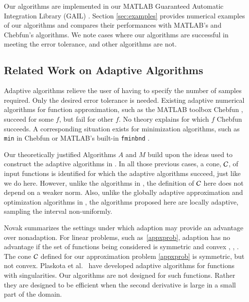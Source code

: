 \documentclass[review]{elsarticle}
\theoremstyle{definition}
\begin{document}
Our algorithms are implemented in our MATLAB Guaranteed Automatic
Integration Library (GAIL) \cite{ChoEtal15a}. Section \ref{sec:examples}
provides numerical examples of our algorithms and compares their
performances with MATLAB's and Chebfun's algorithms. We note cases where our
algorithms are successful in meeting the error tolerance, and other
algorithms are not.

\subsection{Related Work on Adaptive Algorithms}

Adaptive algorithms relieve the user of having to specify the number of samples
required. Only the desired error tolerance is needed. Existing adaptive
numerical algorithms for function approximation, such as the MATLAB toolbox
Chebfun \citep{TrefEtal16a}, succeed for some $f$, but fail for other $f$. No
theory explains for which $f$ Chebfun succeeds. A corresponding situation exists
for minimization algorithms, such as \texttt{min} in Chebfun or MATLAB's
built-in \texttt{fminbnd} \citep{MAT9.1}.

Our theoretically justified Algorithms $A$ and $M$ build upon the ideas used to
construct the adaptive algorithms in \cite{HicEtal14b, Din15a, HicEtal14a,
HicJim16a, Jia16a, JimHic16a,Ton14a}. In all those previous cases, a
cone, $\mathcal{C}$, of input functions is identified for which the adaptive algorithms
succeed, just like we do here. However, unlike the algorithms in \cite{HicEtal14b, Din15a,
HicEtal14a,Ton14a}, the definition of $\mathcal{C}$ here does not
depend on a weaker norm. Also, unlike
the globally adaptive approximation and optimization algorithms in
\cite{HicEtal14b,Ton14a}, the algorithms proposed here are locally adaptive,
sampling the interval non-uniformly.

Novak \cite{Nov96a} summarizes the settings under which adaption may provide an
advantage over nonadaption. For linear problems, such as~\eqref{appxprob},
adaption has no advantage if the set of functions being considered is symmetric
and convex \cite[Theorem 1]{Nov96a}, \cite[Chapter 4, Theorem
5.2.1]{TraWasWoz88}, \cite{Woz88a}.
The cone $\mathcal{C}$ defined for our approximation
problem
\eqref{appxprob} is symmetric, but not convex. Plaskota et al.~\cite{PlaEtal08a}
have developed adaptive algorithms for functions with singularities. Our
algorithms are not designed for such functions. Rather they are
designed to be efficient when the second derivative is large in a small part of
the domain.
\end{document}
